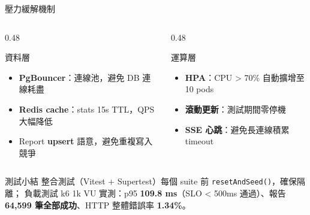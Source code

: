 \documentclass[aspectratio=169,12pt]{beamer}
\begin{document}
\begin{frame}[shrink=28]{壓力緩解機制}
\begin{columns}[T,onlytextwidth]
\begin{column}{0.48\textwidth}
  \begin{block}{資料層}
    \begin{itemize}\small
      \item \textbf{PgBouncer}：連線池，避免 DB 連線耗盡
      \item \textbf{Redis cache}：stats 15s TTL，QPS 大幅降低
      \item Report \textbf{upsert} 語意，避免重複寫入競爭
    \end{itemize}
  \end{block}
\end{column}
\begin{column}{0.48\textwidth}
  \begin{block}{運算層}
    \begin{itemize}\small
      \item \textbf{HPA}：CPU \textgreater{} 70\% 自動擴增至 10 pods
      \item \textbf{滾動更新}：測試期間零停機
      \item \textbf{SSE 心跳}：避免長連線積累 timeout
    \end{itemize}
  \end{block}
\end{column}
\end{columns}
\vspace{0.3cm}
\begin{exampleblock}{測試小結}
  \small
  整合測試（Vitest + Supertest）每個 suite 前 \texttt{resetAndSeed()}，確保隔離；
  負載測試 k6 1k VU 實測：p95 \textbf{109.8 ms}（SLO \textless{} 500ms 通過）、報告 \textbf{64,599 筆全部成功}、HTTP 整體錯誤率 \textbf{1.34\%}。
\end{exampleblock}
\end{frame}
\end{document}
